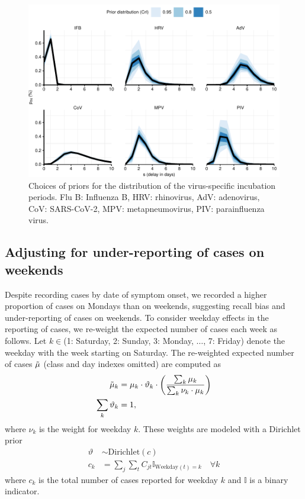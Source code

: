 \documentclass[fleqn,11pt]{wlscirep_supp}
\begin{document}
\begin{figure}[!htpb]
    \centering
    \includegraphics{../../results/epi-data/incubation-periods.pdf}
    \caption[Choices of priors for the incubation periods]{Choices of priors for the distribution of the virus-specific incubation periods. Flu B: Influenza B, HRV: rhinovirus, AdV: adenovirus, CoV: SARS-CoV-2, MPV: metapneumovirus, PIV: parainfluenza virus.}
    \label{fig:prior-pin}
\end{figure}

\subsection{Adjusting for under-reporting of cases on weekends}

Despite recording cases by date of symptom onset, we recorded a higher proportion of cases on Mondays than on weekends, suggesting recall bias and under-reporting of cases on weekends. To consider weekday effects in the reporting of cases, we re-weight the expected number of cases each week as follows. Let $k \in $(1: Saturday, 2: Sunday, 3: Monday, $\dots$, 7: Friday) denote the weekday with the week starting on Saturday. The re-weighted expected number of cases $\Tilde{\mu}$ (class and day indexes omitted) are computed as
\begin{align*}
    \Tilde{\mu}_{k} &= \mu_k \cdot \vartheta_k \cdot \left(\frac{\sum_k \mu_k}{\sum_k \nu_k \cdot \mu_k}\right)\\
    \sum_k \vartheta_k &= 1,
\end{align*}
where $\nu_k$ is the weight for weekday $k$. These weights are modeled with a Dirichlet prior
\begin{align*}
    \vartheta &\sim \text{Dirichlet}(c) \\
    c_k &= \sum_j \sum_t C_{jt} \mathbb{I}_{\text{Weekday}(t)=k} \quad \forall k
\end{align*}
where $c_k$ is the total number of cases reported for weekday $k$ and $\mathbb{I}$ is a binary indicator. 
\end{document}
